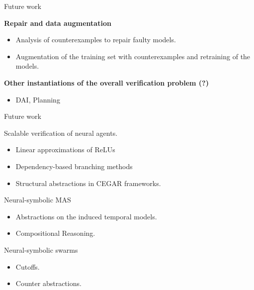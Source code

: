 \documentclass[10pt]{beamer}
\begin{document}
\begin{frame}{Future work}
\begin{footnotesize}
\end{footnotesize}
	{\bf Repair and data augmentation}
	\begin{footnotesize}
	\begin{itemize}
		\item Analysis of counterexamples to repair faulty models.
		\item Augmentation of the training set with counterexamples
			and retraining of the models.
	\end{itemize}
	\end{footnotesize}




{\bf Other instantiations of the overall verification problem (?)}
	\begin{footnotesize}
\begin{itemize}
	\item DAI, Planning
\end{itemize}
\end{footnotesize}
		
\end{frame}



\begin{frame}{Future work}

\begin{block}{Scalable verification of neural agents.}
\begin{itemize}
	\item Linear approximations of ReLUs
	\item Dependency-based branching methods
	\item Structural abstractions in CEGAR frameworks.
\end{itemize}
\end{block}

\begin{exampleblock}{Neural-symbolic MAS}
\begin{itemize}
	\item Abstractions on the induced temporal models.
	\item Compositional Reasoning.
\end{itemize}
\end{exampleblock}

\begin{alertblock}{Neural-symbolic swarms}
	\begin{itemize}
		\item Cutoffs.
		\item Counter abstractions.
	\end{itemize}
\end{alertblock}
\end{frame}
\end{document}

